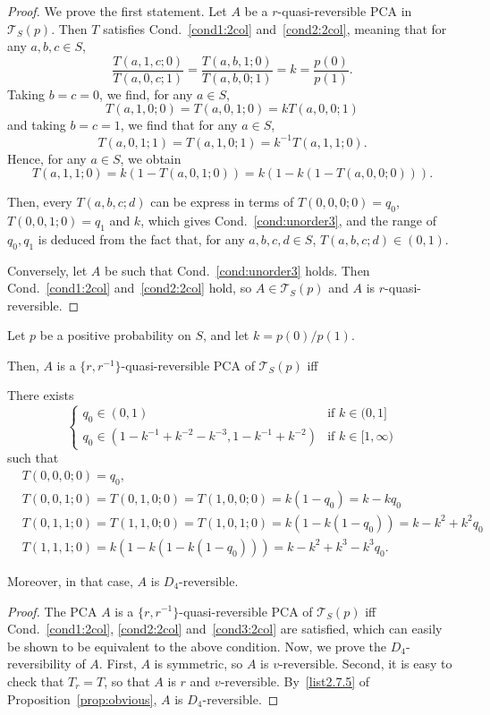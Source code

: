 \documentclass[AHL,Unicode,longabstracts]{cedram}
\newcounter{a}
\newcommand{\Cond}{Cond.}
\newenvironment{cond}{\refstepcounter{a}{\upshape\emph{Cond.~\thea}}\pointir}{}
\newcommand{\triang}[2]{\mathcal{T}_{#1} \left(#2 \right)}
\begin{document}
\begin{proof}
We prove the first statement. Let $A$ be a $r$-quasi-reversible PCA in $\triang{S}{p}$.
Then $T$ satisfies \Cond~\ref{cond1:2col} and~\ref{cond2:2col}, meaning that for any $a,b,c \in S$,
\[
\frac{T(a,1,c;0)}{T(a,0,c;1)} = \frac{T(a,b,1;0)}{T(a,b,0;1)} = k = \frac{p(0)}{p(1)}.
\]
Taking $b=c=0$, we find, for any $a \in S$,
\[
T(a,1,0;0) = T(a,0,1;0) = k T(a,0,0;1)
\]
and taking $b=c=1$, we find that for any $a \in S$,
\[
T(a,0,1;1) = T(a,1,0;1) = k^{-1} T(a,1,1;0).
\]
Hence, for any $a \in S$, we obtain
\[
T(a,1,1;0) = k (1-T(a,0,1;0)) = k (1 - k (1-T(a,0,0;0))).
\]

Then, every $T(a,b,c;d)$ can be express in terms of $T(0,0,0;0) =q_0$, $T(0,0,1;0) =q_1$ and $k$, which gives \Cond~\ref{cond:unorder3}, and the range of $q_0,q_1$ is deduced from the fact that, for any $a,b,c,d \in S$, $T(a,b,c;d) \in (0,1)$.

Conversely, let $A$ be such that \Cond~\ref{cond:unorder3} holds. Then \Cond~\ref{cond1:2col} and~\ref{cond2:2col} hold, so $A \in \triang{S}{p}$ and $A$ is $r$-quasi-reversible.
\end{proof}

\begin{prop}\label{theo:drev2col}
Let $p$ be a positive probability on $S$, and let $k=p(0)/p(1)$.

Then, $A$ is a $\{r,r^{-1}\}$-quasi-reversible PCA of $\triang{S}{p}$ iff

\textnormal{\begin{cond} \label{cond:unorder2}
There exists
\[
\begin{cases}
q_0 \in (0,1) & \text{if } k \in (0,1]\\
q_0 \in (1-k^{-1}+k^{-2}-k^{-3},1-k^{-1}+k^{-2}) & \text{if } k \in [1,\infty)
\end{cases}
\]
such that
\begin{align*}
&T(0,0,0;0) = q_0,\\
&T(0,0,1;0) = T(0,1,0;0) = T(1,0,0;0) = k (1-q_0) = k-kq_0\\
&T(0,1,1;0) = T(1,1,0;0) = T(1,0,1;0) = k (1-k(1-q_0)) = k-k^2+k^2q_0\\
&T(1,1,1;0) = k(1-k(1-k(1-q_0))) = k -k^2 + k^3 -k^3q_0.
\end{align*}
\end{cond}}

Moreover, in that case, $A$ is $D_4$-reversible.
\end{prop}

\begin{proof}
The PCA $A$ is a $\{r,r^{-1}\}$-quasi-reversible PCA of $\triang{S}{p}$ iff \Cond~\ref{cond1:2col}, \ref{cond2:2col} and~\ref{cond3:2col} are satisfied, which can easily be shown to be equivalent to the above condition.
Now, we prove the $D_4$-reversibility of $A$. First, $A$ is symmetric, so $A$ is $v$-reversible. Second, it is easy to check that $T_r=T$, so that $A$ is $r$ and $v$-reversible. By~\eqref{list2.7.5} of Proposition~\ref{prop:obvious}, $A$ is $D_4$-reversible.
\end{proof}
\end{document}
